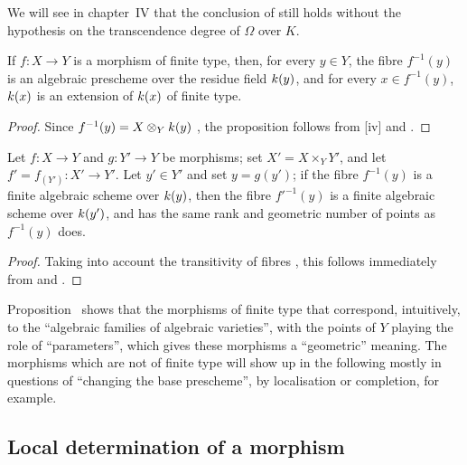 \begin{rmk}[6.4.10]
\label{1.6.4.10}
We will see in chapter~IV that the conclusion of  still holds without the hypothesis on the transcendence degree of $\Omega$ over $K$.
\end{rmk}

\begin{prop}[6.4.11]
\label{1.6.4.11}
If $f:X\to Y$ is a morphism of finite type, then, for every $y\in Y$, the fibre $f^{-1}(y)$ is an algebraic prescheme over the residue field $k(y)$, and for every $x\in f^{-1}(y)$, $k(x)$ is an extension of $k(x)$ of finite type.
\end{prop}

\begin{proof}
\label{proof-1.6.4.11}
Since $f^{-1}(y)=X\otimes_Yk(y)$ , the proposition follows from [iv] and .
\end{proof}

\begin{prop}[6.4.12]
\label{1.6.4.12}
Let $f:X\to Y$ and $g:Y'\to Y$ be morphisms;
set $X'=X\times_Y Y'$, and let $f'=f_{(Y')}:X'\to Y'$.
Let $y'\in Y'$ and set $y=g(y')$;
if the fibre $f^{-1}(y)$ is a finite algebraic scheme over $k(y)$, then the fibre $f'^{-1}(y)$ is a finite algebraic scheme over $k(y')$, and has the same rank and geometric number of points as $f^{-1}(y)$ does.
\end{prop}

\begin{proof}
\label{proof-1.6.4.12}
Taking into account the transitivity of fibres , this follows immediately from  and .
\end{proof}

\begin{env}[6.4.13]
\label{1.6.4.13}
Proposition~ shows that the morphisms of finite type that correspond, intuitively, to the ``algebraic families of algebraic varieties'', with the points of $Y$ playing the
role of ``parameters'', which gives these morphisms a ``geometric'' meaning.
The morphisms which are not of finite type will show up in the following mostly in questions of ``changing the base prescheme'', by localisation or completion, for example.
\end{env}

\subsection{Local determination of a morphism}

